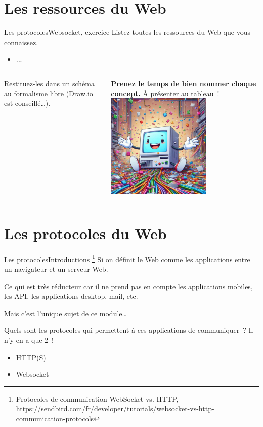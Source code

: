 \documentclass{beamer}
\begin{document}
    \section{Les ressources du Web}\label{sec:ressources}
    \begin{frame}{Les protocoles}{Websocket, exercice \execcounterdispinc}
        Listez toutes les ressources du Web que vous connaissez.
        \begin{itemize}
            \item ...
        \end{itemize}
        \bigbreak
        \begin{columns}
            Restituez-les dans un schéma au formalisme libre (Draw.io est conseillé\ldots).

            \textbf{Prenez le temps de bien nommer chaque concept.}
            \bigbreak
            À présenter au tableau~!
            \centering
            \includegraphics[width=5cm]{image/computer-n-web-ressources}
        \end{columns}
    \end{frame}


    \section{Les protocoles du Web}\label{sec:protocoles}

    \begin{frame}{Les protocoles}{Introductions}
        \footnote{\label{sendbird-protocole}Protocoles de communication WebSocket vs. HTTP, \url{https://sendbird.com/fr/developer/tutorials/websocket-vs-http-communication-protocols}}
        Si on définit le Web comme les applications entre un navigateur et un serveur Web.
        \begin{dangercolorbox}
            Ce qui est très réducteur car il ne prend pas en compte les applications mobiles, les API, les applications desktop, mail, etc.

            Mais c'est l'unique sujet de ce module\ldots
        \end{dangercolorbox}
        Quels sont les protocoles qui permettent à ces applications de communiquer~?
        \pause
        \bigbreak
        Il n'y en a que 2~!
        \begin{itemize}
            \item HTTP(S)
            \item Websocket
        \end{itemize}
    \end{frame}
\end{document}
